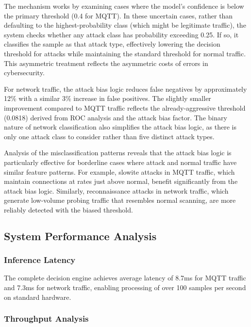 \documentclass[conference]{IEEEtran}
\begin{document}
The mechanism works by examining cases where the model's confidence is below the primary threshold (0.4 for MQTT). In these uncertain cases, rather than defaulting to the highest-probability class (which might be legitimate traffic), the system checks whether any attack class has probability exceeding 0.25. If so, it classifies the sample as that attack type, effectively lowering the decision threshold for attacks while maintaining the standard threshold for normal traffic. This asymmetric treatment reflects the asymmetric costs of errors in cybersecurity.

For network traffic, the attack bias logic reduces false negatives by approximately 12\% with a similar 3\% increase in false positives. The slightly smaller improvement compared to MQTT traffic reflects the already-aggressive threshold (0.0818) derived from ROC analysis and the attack bias factor. The binary nature of network classification also simplifies the attack bias logic, as there is only one attack class to consider rather than five distinct attack types.

Analysis of the misclassification patterns reveals that the attack bias logic is particularly effective for borderline cases where attack and normal traffic have similar feature patterns. For example, slowite attacks in MQTT traffic, which maintain connections at rates just above normal, benefit significantly from the attack bias logic. Similarly, reconnaissance attacks in network traffic, which generate low-volume probing traffic that resembles normal scanning, are more reliably detected with the biased threshold.


\subsection{System Performance Analysis}

\subsubsection{Inference Latency}

The complete decision engine achieves average latency of 8.7ms for MQTT traffic and 7.3ms for network traffic, enabling processing of over 100 samples per second on standard hardware.

\subsubsection{Throughput Analysis}
\end{document}
